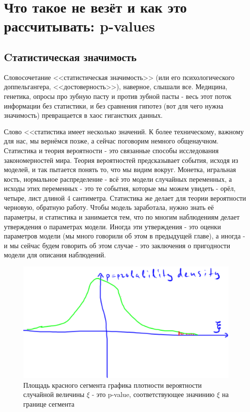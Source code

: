 \documentclass{book}
\begin{document}
 

\chapter[Что такое не везёт: p-values]{Что такое не везёт и как это рассчитывать: p-values}

\section*{Cтатистическая значимость}

Словосочетание <<статистическая значимость>> (или его психологического доппельгангера, <<достоверность>>), наверное, слышали все. Медицина, генетика, опросы про зубную пасту и против зубной пасты - весь этот поток информации без статистики, и без сравнения гипотез (вот для чего нужна значимость) превращается в хаос гиганстких данных.

Слово <<статистика имеет несколько значений. К более техническому, важному для нас, мы вернёмся позже, а сейчас поговорим немного общенаучном. Статистика и теория вероятности - это связанные способы исследования закономерностей мира. Теория вероятностей предсказывает события, исходя из моделей, и так пытается понять то, что мы видим вокруг. Монетка, игральная кость, нормальное распределение - всё это модели случайных переменных, а исходы этих переменных - это те события, которые мы можем увидеть - орёл, четыре, лист длиной 4 сантиметра. Статистика же делает для теории вероятности черновую, обратную работу. Чтобы модель заработала, нужно знать её параметры, и статистика и занимается тем, что по многим наблюдениям делает утверждения о параметрах модели. Иногда эти утверждения - это оценки параметров модели (мы много говорили об этом в предыдущей главе), а иногда - и мы сейчас будем говорить об этом случае - это заключения о пригодности модели для описания наблюдений.

\begin{figure}
    \centering
    \includegraphics[scale=.5]{img/p-value.png}
    \caption{Площадь красного сегмента графика плотности вероятности случайной величины $\xi$ - это p-value, соответствующее значинию $\xi$ на границе сегмента}
    \label{pval}
\end{figure}



 
\end{document}
